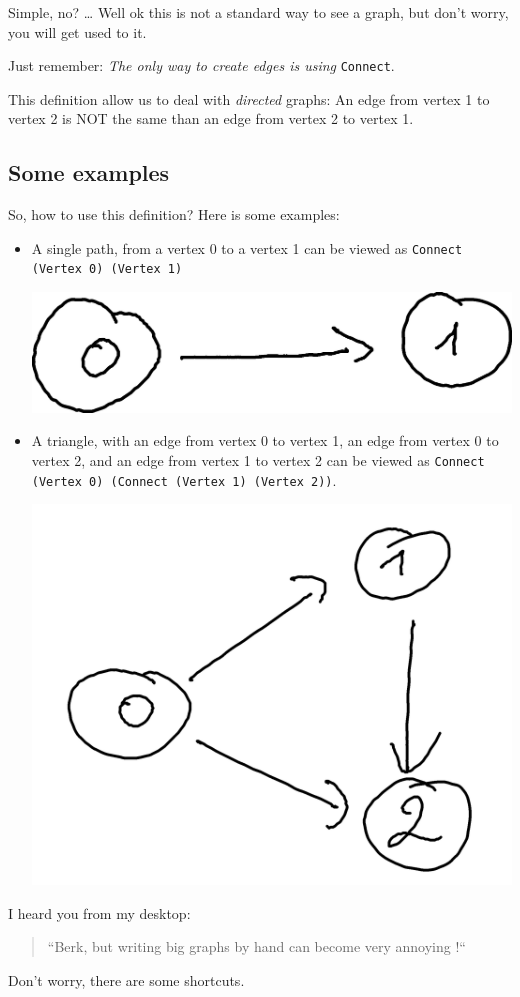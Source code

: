 \documentclass[10pt,a4paper]{article}
\begin{document}
Simple, no?
\ldots
Well ok this is not a standard way to see a graph, but don't worry, you will get used to it.

Just remember: \emph{The only way to create edges is using} \verb|Connect|.

This definition allow us to deal with \emph{directed} graphs: An edge from vertex 1 to vertex 2 is NOT the same than an edge from vertex 2 to vertex 1.

\subsection{Some examples}

So, how to use this definition? Here is some examples:

\begin{itemize}
	\item A single path, from a vertex 0 to a vertex 1 can be viewed as \verb|Connect (Vertex 0) (Vertex 1)|
	\begin{center}
	\includegraphics[scale=0.5]{figspng/e2.png}
	\end{center}
	\item A triangle, with an edge from vertex 0 to vertex 1, an edge from vertex 0 to vertex 2, and an edge from vertex 1 to vertex 2 can be viewed as \verb|Connect (Vertex 0) (Connect (Vertex 1) (Vertex 2))|.
	\begin{center}
	\includegraphics[scale=0.5]{figspng/e1.png}
	\end{center}

\end{itemize}
I heard you from my desktop:
\begin{quote}
	``Berk, but writing big graphs by hand can become very annoying !``
\end{quote}
Don't worry, there are some shortcuts.
\end{document}
